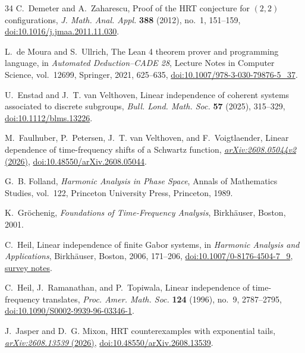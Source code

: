 \documentclass[reqno]{amsart}
\theoremstyle{remark}
\numberwithin{equation}{section}
\begin{document}
\begin{thebibliography}{34}
C.~Demeter and A.~Zaharescu,
Proof of the HRT conjecture for \((2,2)\) configurations,
\emph{J. Math. Anal. Appl.} \textbf{388} (2012), no.~1, 151--159,
\href{https://doi.org/10.1016/j.jmaa.2011.11.030}
{doi:10.1016/j.jmaa.2011.11.030}.

L.~de Moura and S.~Ullrich,
The Lean 4 theorem prover and programming language,
in \emph{Automated Deduction--CADE 28},
Lecture Notes in Computer Science, vol.~12699,
Springer, 2021, 625--635,
\href{https://doi.org/10.1007/978-3-030-79876-5_37}
{doi:10.1007/978-3-030-79876-5\_37}.

U.~Enstad and J.~T. van Velthoven,
Linear independence of coherent systems associated to discrete subgroups,
\emph{Bull. Lond. Math. Soc.} \textbf{57} (2025), 315--329,
\href{https://doi.org/10.1112/blms.13226}{doi:10.1112/blms.13226}.

M.~Faulhuber, P.~Petersen, J.~T. van Velthoven, and F.~Voigtlaender,
Linear dependence of time-frequency shifts of a Schwartz function,
\href{https://arxiv.org/abs/2608.05044}{\emph{arXiv:2608.05044v2} (2026)},
\href{https://doi.org/10.48550/arXiv.2608.05044}
{doi:10.48550/arXiv.2608.05044}.

G.~B. Folland,
\emph{Harmonic Analysis in Phase Space},
Annals of Mathematics Studies, vol.~122,
Princeton University Press, Princeton, 1989.

K.~Gr\"ochenig,
\emph{Foundations of Time-Frequency Analysis},
Birkh\"auser, Boston, 2001.

C.~Heil,
Linear independence of finite Gabor systems,
in \emph{Harmonic Analysis and Applications},
Birkh\"auser, Boston, 2006, 171--206,
\href{https://doi.org/10.1007/0-8176-4504-7_9}
{doi:10.1007/0-8176-4504-7\_9},
\href{https://heil.math.gatech.edu/papers/hrtnotes.pdf}{survey notes}.

C.~Heil, J.~Ramanathan, and P.~Topiwala,
Linear independence of time-frequency translates,
\emph{Proc. Amer. Math. Soc.} \textbf{124} (1996), no.~9, 2787--2795,
\href{https://doi.org/10.1090/S0002-9939-96-03346-1}
{doi:10.1090/S0002-9939-96-03346-1}.

J.~Jasper and D.~G. Mixon,
HRT counterexamples with exponential tails,
\href{https://arxiv.org/abs/2608.13539}{\emph{arXiv:2608.13539} (2026)},
\href{https://doi.org/10.48550/arXiv.2608.13539}
{doi:10.48550/arXiv.2608.13539}.


\end{thebibliography}
\end{document}
